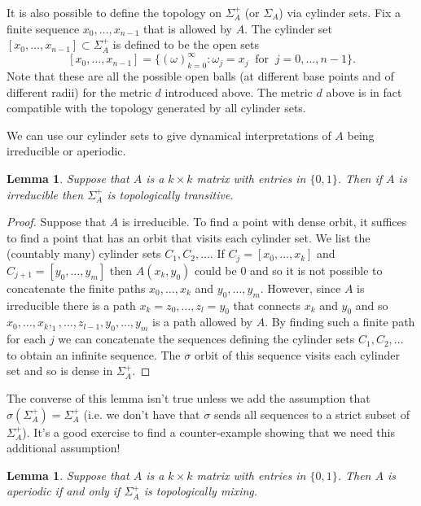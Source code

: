 \documentclass[12pt]{article}
\newtheorem{lemma}[theorem]{Lemma}
\theoremstyle{definition}
\theoremstyle{remark}
\begin{document}
It is also possible to define the topology on $\Sigma_A^+$ (or $\Sigma_A$) via cylinder sets. Fix a finite sequence $x_0, \ldots, x_{n-1}$ that is allowed by $A$. The cylinder set $[x_0, \ldots, x_{n-1}] \subset \Sigma_A^+$ is defined to be the open sets
\[
[x_0, \ldots, x_{n-1}] = \{ (\omega)_{k=0}^\infty: \omega_j = x_j \ \text{ for } \ j=0, \dots, n-1\}.
\] 
Note that these are all the possible open balls (at different base points and of different radii) for the metric $d$ introduced above. The metric $d$ above is in fact compatible with the topology generated by all cylinder sets.


We can use our cylinder sets to give dynamical interpretations of $A$ being irreducible or aperiodic.
\begin{lemma}\label{lem.tt}
Suppose that $A$ is a $k \times k$ matrix with entries in $\{0,1\}$. Then if $A$ is irreducible then $\Sigma_A^+$ is topologically transitive.
\end{lemma}
\begin{proof}
Suppose that $A$ is irreducible. To find a point with dense orbit, it suffices to find a point that has an orbit that visits each cylinder set. 
We list the (countably many) cylinder sets $C_1, C_2, \ldots$. If $C_j = [x_0, \ldots, x_k]$ and $C_{j+1} = [y_0, \ldots, y_m]$ then $A(x_k, y_0)$ could be $0$ and so it is not possible to concatenate the finite paths $x_0, \ldots, x_k$ and $y_0, \dots, y_m$. However, since $A$ is irreducible there is a path $x_k= z_0,\ldots, z_l= y_0$ that connects $x_k$ and $y_0$ and so $x_0, \ldots, x_k, _1, \ldots, z_{l-1}, y_0, \ldots, y_m$ is a path allowed by $A$. By finding such a finite path for each $j$ we can concatenate the sequences defining the cylinder sets $C_1, C_2, \ldots$ to obtain an infinite sequence. The $\sigma$ orbit of this sequence visits each cylinder set and so is dense in $\Sigma_A^+$.
\end{proof}
The converse of this lemma isn't true unless we add the assumption that $\sigma(\Sigma_A^+) =\Sigma_A^+$ (i.e. we don't have that $\sigma$ sends all sequences to a strict subset of $\Sigma_A^+$). It's a good exercise to find a counter-example showing that we need this additional assumption!

\begin{lemma}
Suppose that $A$ is a $k \times k$ matrix with entries in $\{0,1\}$. Then $A$ is aperiodic if and only if $\Sigma_A^+$ is topologically mixing.
\end{lemma}
\end{document}

